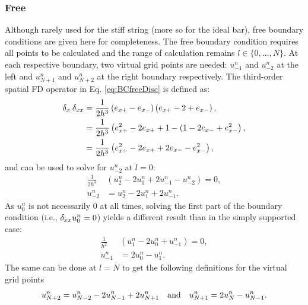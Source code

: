 \subsubsection{Free}
Although rarely used for the stiff string (more so for the ideal bar), free boundary conditions are given here for completeness. The free boundary condition requires all points to be calculated and the range of calculation remains $l\in\{0, \hdots, N\}$. At each respective boundary, two virtual grid points are needed: $u_{-1}^n$ and $u_{-2}^n$ at the left and $u_{N+1}^n$ and $u_{N+2}^n$ at the right boundary respectively.
The third-order spatial FD operator in Eq. \eqref{eq:BCfreeDisc} is defined as:
\begin{align}
    \delta_{x\cdot}\delta_{xx} &= \frac{1}{2h^3}\left(e_{x+}-e_{x-}\right)\left(e_{x+}-2+e_{x-}\right),\nonumber\\
    &=\frac{1}{2h^3}\left(e_{x+}^2 - 2e_{x+} + 1 - (1 - 2e_{x-} + e_{x-}^2\right),\nonumber\\
    &=\frac{1}{2h^3}\left(e_{x+}^2 - 2e_{x+} + 2e_{x-} -e_{x-}^2\right),
\end{align}
and can be used to solve for $u_{-2}^n$ at $l=0$:
\begin{align*}
    \frac{1}{2h^3} &\left(u_2^n - 2 u_1^n + 2u_{-1}^n - u_{-2}^n\right) = 0,\\%
    u_{-2}^n &= u_2^n - 2 u_1^n + 2u_{-1}^n.
\end{align*}
As $u_0^n$ is not necessarily $0$ at all times, solving the first part of the boundary condition (i.e., $\delta_{xx} u_0^n = 0$) yields a different result than in the simply supported case:
\begin{align*}
    \frac{1}{h^2} &\left(u_1^n - 2 u_0^n + u_{-1}^n \right) = 0,\\
    u_{-1}^n &= 2u_0^n - u_1^n.
\end{align*}
The same can be done at $l=N$ to get the following definitions for the virtual grid points
\begin{equation*}
    u_{N+2}^n = u_{N-2}^n - 2 u_{N-1}^n + 2u_{N+1}^n
    \quad \text{and} \quad u_{N+1}^n = 2u_N^n - u_{N-1}^n.
\end{equation*}
